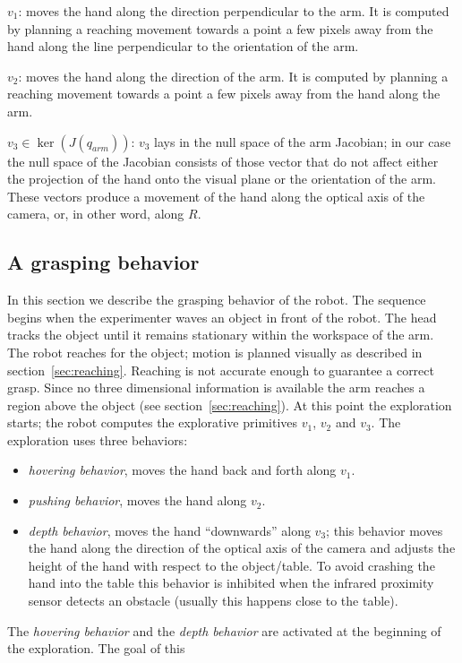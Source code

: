 $v_1$: moves the hand along the
direction perpendicular to the arm. It is computed by planning a 
reaching movement towards a point a few pixels away from the hand along the
line perpendicular to the orientation of the arm.

$v_2$: moves the hand along the
direction of the arm. It is computed by planning a 
reaching movement towards a point a few pixels away from the hand along the 
arm.

$v_3\in \ker \left(J\left(q_{arm}\right)\right)$: $v_3$ lays in the null 
space of the arm Jacobian; in our case the null space of the Jacobian 
consists of those vector that do not affect
either the projection of the hand onto the visual plane or the orientation
of the arm. These vectors produce a movement of the hand along the optical
axis of the camera, or, in other word, along $R$.
%
\subsection{A grasping behavior}
In this section we describe the grasping behavior of the robot.
The sequence begins when the experimenter waves an object in front
of the robot. The head tracks the object until it remains
stationary within the workspace of the arm. The robot reaches for
the object; motion is planned visually as described in
section~\ref{sec:reaching}. Reaching is not accurate enough to
guarantee a correct grasp. Since no three dimensional information
is available the arm reaches a region above the object (see
section~\ref{sec:reaching}). At this point the exploration starts;
the robot computes the explorative primitives $v_1$, $v_2$ and
$v_3$. The exploration uses three behaviors: 
%
\begin{itemize}
\item \emph{hovering behavior}, moves the hand back and forth along 
$v_1$.
%
\item \emph{pushing behavior}, moves the hand
along $v_2$.
%
\item \emph{depth behavior}, moves the hand ``downwards''
along $v_3$; this behavior moves the hand along the direction of
the optical axis of the camera and adjusts the height of the hand
with respect to the object/table. To avoid crashing the hand into
the table this behavior is inhibited when the infrared proximity
sensor detects an obstacle (usually this happens close to the
table).
%
\end{itemize}
%
The \emph{hovering behavior} and the \emph{depth behavior} are
activated at the beginning of the exploration. The goal of this
